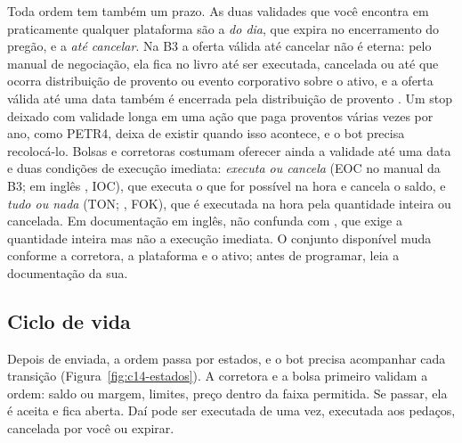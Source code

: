 Toda ordem tem também um prazo. As duas validades que você encontra em praticamente qualquer plataforma são a \emph{do dia}, que expira no encerramento do pregão, e a \emph{até cancelar}. Na B3 a oferta válida até cancelar não é eterna: pelo manual de negociação, ela fica no livro até ser executada, cancelada ou até que ocorra distribuição de provento ou evento corporativo sobre o ativo, e a oferta válida até uma data também é encerrada pela distribuição de provento \citep{b3mpo}. Um stop deixado com validade longa em uma ação que paga proventos várias vezes por ano, como PETR4, deixa de existir quando isso acontece, e o bot precisa recolocá-lo. Bolsas e corretoras costumam oferecer ainda a validade até uma data e duas condições de execução imediata: \emph{executa ou cancela} (EOC no manual da B3; em inglês , IOC), que executa o que for possível na hora e cancela o saldo, e \emph{tudo ou nada} (TON; , FOK), que é executada na hora pela quantidade inteira ou cancelada. Em documentação em inglês, não confunda com , que exige a quantidade inteira mas não a execução imediata. O conjunto disponível muda conforme a corretora, a plataforma e o ativo; antes de programar, leia a documentação da sua.

\subsection{Ciclo de vida}

Depois de enviada, a ordem passa por estados, e o bot precisa acompanhar cada transição (Figura~\ref{fig:c14-estados}). A corretora e a bolsa primeiro validam a ordem: saldo ou margem, limites, preço dentro da faixa permitida. Se passar, ela é aceita e fica aberta. Daí pode ser executada de uma vez, executada aos pedaços, cancelada por você ou expirar.

